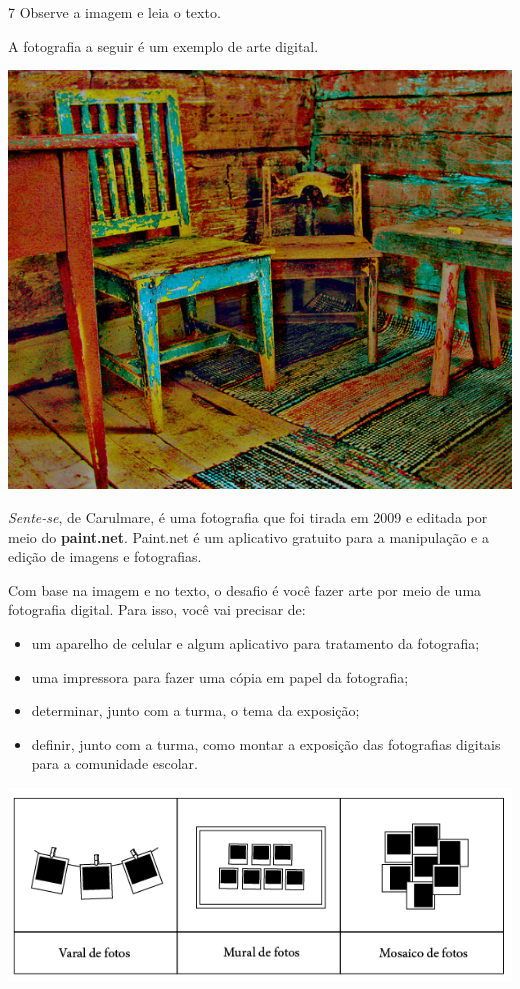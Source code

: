 
\pagebreak
\num{7}  Observe a imagem e leia o texto.

A fotografia a seguir é um exemplo de arte digital.

\begin{center}
\includegraphics[width=.7\textwidth]{./imgs/art5.png}
\end{center}

\noindent\emph{Sente-se}, de Carulmare, é uma fotografia que foi tirada em 2009
e editada por meio do \textbf{paint.net}. Paint.net é um aplicativo gratuito para a manipulação e a edição de imagens e fotografias.

Com base na imagem e no texto, o desafio é você fazer arte por meio de uma
fotografia digital. Para isso, você vai precisar de:

\begin{itemize}
\item
  um aparelho de celular e algum aplicativo para tratamento da
  fotografia;
\item
  uma impressora para fazer uma cópia em papel da fotografia;
\item
  determinar, junto com a turma, o tema da exposição;
\item
  definir, junto com a turma, como montar a exposição das fotografias
  digitais para a comunidade escolar.
\end{itemize}

\begin{center}
\includegraphics[width=.95\textwidth]{../ilustracoes/ART5/SAEB_5ANO_ART_FIGURA5.png}
\end{center}

